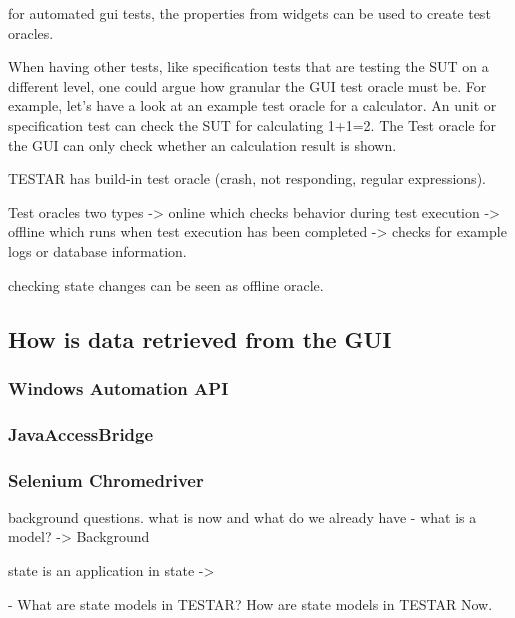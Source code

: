 for automated gui tests, the properties from widgets can be used to create test oracles. 

When having other tests, like specification tests that are testing the SUT on a different level, one could argue how granular the GUI test oracle must be. For example, let's have a look at an example test oracle for a calculator. An unit or specification test can check the SUT for calculating 1+1=2. The Test oracle for the GUI can only check whether an calculation result is shown.  

TESTAR has build-in test oracle (crash, not responding, regular expressions).  

Test oracles two types -> online which checks behavior during test execution -> offline which runs when test execution has been completed -> checks for example logs or database information.

checking state changes can be seen as offline oracle. 
 
 

\subsection{How is data retrieved from the GUI}
\subsubsection{Windows Automation API}
\subsubsection{JavaAccessBridge}
\subsubsection{Selenium Chromedriver}

background questions. what is now and what do we already have
- what is a model? -> Background

state is an application in state -> 

- What are state models in TESTAR?
How are state models in TESTAR Now.

